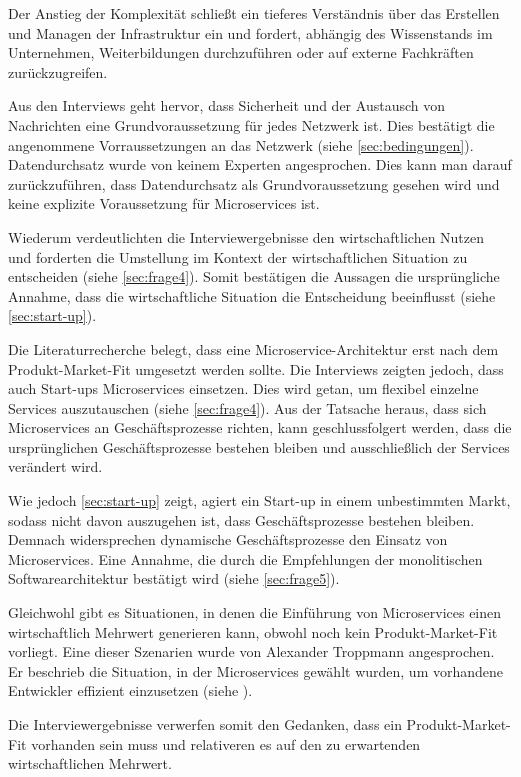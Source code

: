 Der Anstieg der Komplexität schließt ein tieferes Verständnis über das Erstellen und Managen der Infrastruktur ein und fordert, abhängig des Wissenstands im Unternehmen, Weiterbildungen durchzuführen oder auf externe Fachkräften zurückzugreifen.

\label{sec:netzwerk}
Aus den Interviews geht hervor, dass Sicherheit und der Austausch von Nachrichten eine Grundvoraussetzung für jedes Netzwerk ist. Dies bestätigt die angenommene Vorraussetzungen an das Netzwerk (siehe \cref{sec:bedingungen}). Datendurchsatz wurde von keinem Experten angesprochen. Dies kann man darauf zurückzuführen, dass Datendurchsatz als Grundvoraussetzung gesehen wird und keine explizite Voraussetzung für Microservices ist.

Wiederum verdeutlichten die Interviewergebnisse den wirtschaftlichen Nutzen und forderten die Umstellung im Kontext der wirtschaftlichen Situation zu entscheiden (siehe \cref{sec:frage4}). Somit bestätigen die Aussagen die ursprüngliche Annahme, dass die wirtschaftliche Situation die Entscheidung beeinflusst (siehe \cref{sec:start-up}).

Die Literaturrecherche belegt, dass eine Microservice-Architektur erst nach dem Produkt-Market-Fit umgesetzt werden sollte. Die Interviews zeigten jedoch, dass auch Start-ups Microservices einsetzen. Dies wird getan, um flexibel einzelne Services auszutauschen (siehe \cref{sec:frage4}). Aus der Tatsache heraus, dass sich Microservices an Geschäftsprozesse richten, kann geschlussfolgert werden, dass die ursprünglichen Geschäftsprozesse bestehen bleiben und ausschließlich der Services verändert wird.

Wie jedoch \cref{sec:start-up} zeigt, agiert ein Start-up in einem unbestimmten Markt, sodass nicht davon auszugehen ist, dass Geschäftsprozesse bestehen bleiben. Demnach widersprechen dynamische Geschäftsprozesse den Einsatz von Microservices. Eine Annahme, die durch die Empfehlungen der monolitischen Softwarearchitektur bestätigt wird (siehe \cref{sec:frage5}).

Gleichwohl gibt es Situationen, in denen die Einführung von Microservices einen wirtschaftlich Mehrwert generieren kann, obwohl noch kein Produkt-Market-Fit vorliegt. Eine dieser Szenarien wurde von Alexander Troppmann angesprochen. Er beschrieb die Situation, in der Microservices gewählt wurden, um vorhandene Entwickler effizient einzusetzen (siehe ).

\label{sec:wirtschaftlich}
Die Interviewergebnisse verwerfen somit den Gedanken, dass ein Produkt-Market-Fit vorhanden sein muss und relativeren es auf den zu erwartenden wirtschaftlichen Mehrwert.

